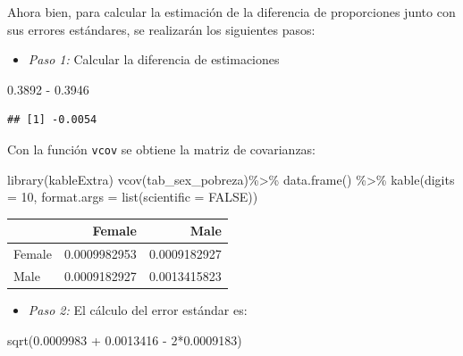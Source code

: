 \documentclass[
  12pt,
]{book}
\newenvironment{Shaded}{\begin{snugshade}}{\end{snugshade}}
\newcommand{\AttributeTok}[1]{\textcolor[rgb]{0.77,0.63,0.00}{#1}}
\newcommand{\ConstantTok}[1]{\textcolor[rgb]{0.00,0.00,0.00}{#1}}
\newcommand{\DecValTok}[1]{\textcolor[rgb]{0.00,0.00,0.81}{#1}}
\newcommand{\FloatTok}[1]{\textcolor[rgb]{0.00,0.00,0.81}{#1}}
\newcommand{\FunctionTok}[1]{\textcolor[rgb]{0.00,0.00,0.00}{#1}}
\newcommand{\NormalTok}[1]{#1}
\newcommand{\SpecialCharTok}[1]{\textcolor[rgb]{0.00,0.00,0.00}{#1}}
\providecommand{\tightlist}{%
  \setlength{\itemsep}{0pt}\setlength{\parskip}{0pt}}
\begin{document}
Ahora bien, para calcular la estimación de la diferencia de proporciones junto con sus errores estándares, se realizarán los siguientes pasos:

\begin{itemize}
\tightlist
\item
  \emph{Paso 1:} Calcular la diferencia de estimaciones
\end{itemize}

\begin{Shaded}
\begin{Highlighting}[]
\FloatTok{0.3892} \SpecialCharTok{{-}} \FloatTok{0.3946}          
\end{Highlighting}
\end{Shaded}

\begin{verbatim}
## [1] -0.0054
\end{verbatim}

Con la función \texttt{vcov} se obtiene la matriz de covarianzas:

\begin{Shaded}
\begin{Highlighting}[]
\FunctionTok{library}\NormalTok{(kableExtra)}
\FunctionTok{vcov}\NormalTok{(tab\_sex\_pobreza)}\SpecialCharTok{\%\textgreater{}\%} \FunctionTok{data.frame}\NormalTok{() }\SpecialCharTok{\%\textgreater{}\%} 
  \FunctionTok{kable}\NormalTok{(}\AttributeTok{digits =} \DecValTok{10}\NormalTok{,}
        \AttributeTok{format.args =} \FunctionTok{list}\NormalTok{(}\AttributeTok{scientific =} \ConstantTok{FALSE}\NormalTok{))}
\end{Highlighting}
\end{Shaded}

\begin{tabular}{l|r|r}
\hline
  & Female & Male\\
\hline
Female & 0.0009982953 & 0.0009182927\\
\hline
Male & 0.0009182927 & 0.0013415823\\
\hline
\end{tabular}

\begin{itemize}
\tightlist
\item
  \emph{Paso 2:} El cálculo del error estándar es:
\end{itemize}

\begin{Shaded}
\begin{Highlighting}[]
\FunctionTok{sqrt}\NormalTok{(}\FloatTok{0.0009983} \SpecialCharTok{+} \FloatTok{0.0013416} \SpecialCharTok{{-}} \DecValTok{2}\SpecialCharTok{*}\FloatTok{0.0009183}\NormalTok{)}
\end{Highlighting}
\end{Shaded}
\end{document}
